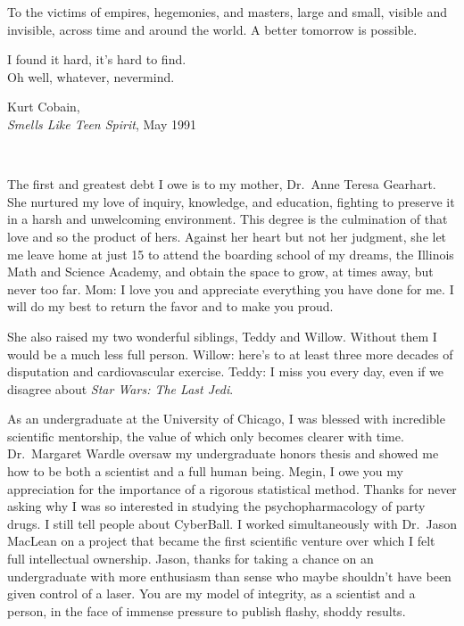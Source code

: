 \begin{frontmatter}

\begin{dedication}
\null\vfil
\begin{center}
	To the victims of empires, hegemonies, and masters,
	large and small, visible and invisible,
	across time and around the world.
	A better tomorrow is possible.\\\vspace{12pt}
\end{center}
\setlength{\epigraphwidth}{0.4\linewidth}
	\epigraph{%
	I found it hard, it's hard to find.\\
	Oh well, whatever, nevermind.}%
	{Kurt Cobain,\\\emph{Smells Like Teen Spirit}, May 1991}
\vfil\null\
\end{dedication}


\tableofcontents
\clearpage
\listoffigures
\clearpage
\listofalgorithms{}

\begin{acknowledgements}
	The first and greatest debt I owe is to my mother,
	Dr.\ Anne Teresa Gearhart.
	She nurtured my love of inquiry, knowledge, and education,
	fighting to preserve it in a harsh and unwelcoming
	environment.
	This degree is the culmination of that love
	and so the product of hers.
	Against her heart but not her judgment,
	she let me leave home at just 15
	to attend the boarding school of my dreams,
	the Illinois Math and Science Academy,
	and obtain the space to grow,
	at times away, but never too far.
	Mom: I love you and appreciate everything you have done for me.
	I will do my best to return the favor and to make you proud.

	She also raised my two wonderful siblings, Teddy and Willow.
	Without them I would be a much less full person.
	Willow: here's to at least three more decades
	of disputation and cardiovascular exercise.
	Teddy: I miss you every day,
	even if we disagree about \emph{Star Wars: The Last Jedi}.

	As an undergraduate at the University of Chicago,
	I was blessed with incredible scientific mentorship,
	the value of which only becomes clearer with time.
	Dr.\ Margaret Wardle oversaw my undergraduate
	honors thesis and showed me how to be both
	a scientist and a full human being.
	Megin, I owe you my appreciation
	for the importance of a rigorous statistical method.
	Thanks for never asking why I was so interested
	in studying the psychopharmacology of party drugs.
	I still tell people about CyberBall.
	I worked simultaneously with
	Dr.\ Jason MacLean on a project that became
	the first scientific venture over which I felt
	full intellectual ownership.
	Jason, thanks for taking a chance on
	an undergraduate with more enthusiasm than sense
	who maybe shouldn't have been given control of a laser.
	You are my model of integrity,
	as a scientist and a person,
	in the face of immense pressure to publish
	flashy, shoddy results.


\end{acknowledgements}
\end{frontmatter}
